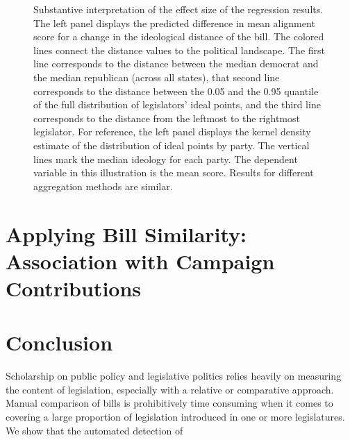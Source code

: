 \documentclass[12pt]{article} %
\begin{document}
\begin{figure}[H]%
\centering
{}
\caption{Substantive interpretation of the effect size of the regression results. The left panel displays the predicted difference in mean alignment score for a change in the ideological distance of the bill. The colored lines connect the distance values to the political landscape. The first line corresponds to the distance between the median democrat and the median republican (across all states), that second line corresponds to the distance between the 0.05 and the 0.95 quantile of the full distribution of legislators' ideal points, and the third line corresponds to the distance from the leftmost to the rightmost legislator. For reference, the left panel displays the kernel density estimate of the distribution of ideal points by party. The vertical lines mark the median ideology for each party. The dependent variable in this illustration is the mean score. Results for different aggregation methods are similar. }
\label{fig:ideo_interpret}
\end{figure}

\section{Applying Bill Similarity: Association with Campaign Contributions}

\section{Conclusion}

Scholarship on public policy and legislative politics relies heavily on measuring the content of legislation, especially with a relative or comparative approach. Manual comparison of bills is prohibitively time consuming when it comes to covering a large proportion of legislation introduced in one or more legislatures. We show that the automated detection of 
\end{document}
